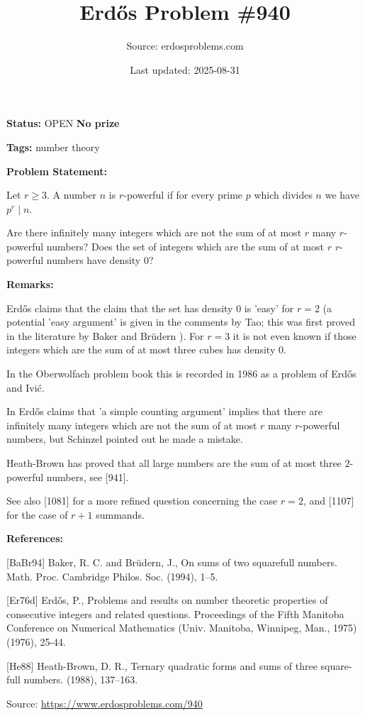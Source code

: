 \documentclass{article}
\title{Erd\H{o}s Problem \#940}
\date{Last updated: 2025-08-31}
\author{Source: erdosproblems.com}
\begin{document}
\maketitle

\noindent\textbf{Status:} OPEN \quad \textbf{No prize}

\noindent\textbf{Tags:} number theory

\medskip
\noindent\textbf{Problem Statement:}

Let $r\geq 3$. A number $n$ is $r$-powerful if for every prime $p$ which divides $n$ we have $p^r\mid n$.

Are there infinitely many integers which are not the sum of at most $r$ many $r$-powerful numbers? Does the set of integers which are the sum of at most $r$ $r$-powerful numbers have density $0$?

\bigskip
\noindent\textbf{Remarks:}

Erd\H{o}s \cite{Er76d} claims that the claim that the set has density $0$ is 'easy' for $r=2$ (a potential 'easy argument' is given in the comments by Tao; this was first proved in the literature by Baker and Br\"{u}dern \cite{BaBr94}). For $r=3$ it is not even known if those integers which are the sum of at most three cubes has density $0$.

In the Oberwolfach problem book this is recorded in 1986 as a problem of Erd\H{o}s and Ivi\'{c}. 

In \cite{Er76d} Erd\H{o}s claims that 'a simple counting argument' implies that there are infinitely many integers which are not the sum of at most $r$ many $r$-powerful numbers, but Schinzel pointed out he made a mistake.

Heath-Brown \cite{He88} has proved that all large numbers are the sum of at most three $2$-powerful numbers, see [941].

See also [1081] for a more refined question concerning the case $r=2$, and [1107] for the case of $r+1$ summands.

\bigskip
\noindent\textbf{References:}

[BaBr94] Baker, R. C. and Br\"udern, J., On sums of two squarefull numbers. Math. Proc. Cambridge Philos. Soc. (1994), 1--5.
 
 [Er76d] Erd\H{o}s, P., Problems and results on number theoretic properties of consecutive integers and related questions. Proceedings of the Fifth Manitoba Conference on Numerical Mathematics (Univ. Manitoba, Winnipeg, Man., 1975) (1976), 25-44.
 
 [He88] Heath-Brown, D. R., Ternary quadratic forms and sums of three square-full numbers. (1988), 137--163.

\bigskip
\noindent\small{Source: \url{https://www.erdosproblems.com/940}}
\end{document}
